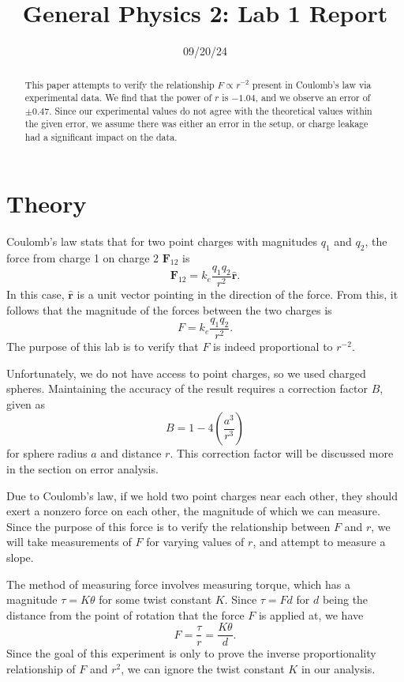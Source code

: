 \documentclass[11pt, letterpaper]{report}
\title{General Physics 2: Lab 1 Report}
\date{09/20/24}
\begin{document}
\maketitle
\begin{abstract}
	This paper attempts to verify the relationship $F\propto  r^{-2}$ present in Coulomb's law via experimental data. We find that the power of $r$ is $-1.04$, and we observe an error of $\pm0.47$. Since our experimental values do not agree with the theoretical values within the given error, we assume there was either an error in the setup, or charge leakage had a significant impact on the data.
\end{abstract}
\section{Theory}
Coulomb's law stats that for two point charges with magnitudes $q_1$ and $q_2$, the force from charge 1 on charge 2 $\mathbf{F}_{12}$ is
\[
	\mathbf{F}_{12}=k_e \frac{q_1q_2}{r^2}\mathbf{\hat{r}}
.\]
In this case, $\mathbf{\hat{r}}$ is a unit vector pointing in the direction of the force. From this, it follows that the magnitude of the forces between the two charges is
\[
	F=k_e \frac{q_1q_2}{r^2}
.\]
The purpose of this lab is to verify that $F$ is indeed proportional to $r^{-2}$.

Unfortunately, we do not have access to point charges, so we used charged spheres. Maintaining the accuracy of the result requires a correction factor $B$, given as
\[
	B=1-4\left( \frac{a^3}{r^3} \right) \]
for sphere radius $a$ and distance $r$. This correction factor will be discussed more in the section on error analysis.

Due to Coulomb's law, if we hold two point charges near each other, they should exert a nonzero force on each other, the magnitude of which we can measure. Since the purpose of this force is to verify the relationship between $F$ and $r$, we will take measurements of $F$ for varying values of $r$, and attempt to measure a slope.

The method of measuring force involves measuring torque, which has a magnitude $\tau =K\theta $ for some twist constant $K$. Since $\tau =Fd$ for $d$ being the distance from the point of rotation that the force $F$ is applied at, we have
\[
	F=\frac{\tau}{r}=\frac{K\theta }{d}
.\]
Since the goal of this experiment is only to prove the inverse proportionality relationship of $F$ and $r^2$, we can ignore the twist constant $K$ in our analysis.
\end{document}
